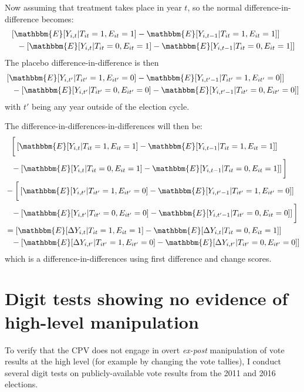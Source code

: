 \documentclass[12pt]{article}
\newcommand{\1}{\mathbbm{1}}
\renewcommand\r{\right}
\renewcommand\l{\left}
\newcommand\E{\mathbbm{E}}
\begin{document}
Now assuming that treatment takes place in year $t$, so the normal difference-in-difference becomes:
	\begin{align*}
		& \l[\E[Y_{i,t} | T_{it}=1, E_{it}=1] - \E[Y_{i,t-1} | T_{it}=1, E_{it}=1]\r] \\
		&\phantom{=} - \l[\E[Y_{i,t} | T_{it}=0, E_{it}=1] - \E[Y_{i,t-1} | T_{it}=0, E_{it}=1]\r]
	\end{align*}
The placebo difference-in-difference is then 
	\begin{align*}
		& \l[\E[Y_{i,t'} | T_{it'}=1, E_{it'}=0] - \E[Y_{i,t'-1} | T_{it'}=1, E_{it'}=0]\r] \\
		&\phantom{=} - \l[\E[Y_{i,t'} | T_{it'}=0, E_{it'}=0] - \E[Y_{i,t'-1} | T_{it'}=0, E_{it'}=0]\r]
	\end{align*}
with $t'$ being any year outside of the election cycle.

The difference-in-differences-in-differences will then be:
	\begin{align*}
		&\phantom{=}\bigg[\l[\E[Y_{i,t} | T_{it}=1, E_{it}=1] - \E[Y_{i,t-1} | T_{it}=1, E_{it}=1]\r] \\
		&\phantom{=} - \l[\E[Y_{i,t} | T_{it}=0, E_{it}=1] - \E[Y_{i,t-1} | T_{it}=0, E_{it}=1]\r]\bigg] \\
		&- \bigg[\l[\E[Y_{i,t'} | T_{it'}=1, E_{it'}=0] - \E[Y_{i,t'-1} | T_{it'}=1, E_{it'}=0]\r] \\
		&\phantom{=} - \l[\E[Y_{i,t'} | T_{it'}=0, E_{it'}=0] - \E[Y_{i,t'-1} | T_{it'}=0, E_{it}=0]\r]\bigg] \\
		& = \l[\E[\Delta Y_{i,t} | T_{it}=1, E_{it}=1] - \E[\Delta Y_{i,t} | T_{it}=0, E_{it}=1]\r] \\
		&\phantom{=} - \l[\E[\Delta Y_{i,t'} | T_{it'}=1, E_{it'}=0] - \E[\Delta Y_{i,t'} | T_{it'}=0, E_{it'}=0]\r]
	\end{align*}	
which is a difference-in-differences using first difference and change scores.

\newpage
\section{Digit tests showing no evidence of high-level manipulation}
\label{app:benford}
To verify that the CPV does not engage in overt \textit{ex-post} manipulation of vote results at the high level (for example by changing the vote tallies), I conduct several digit tests on publicly-available vote results from the 2011 and 2016 elections. 
\end{document}
